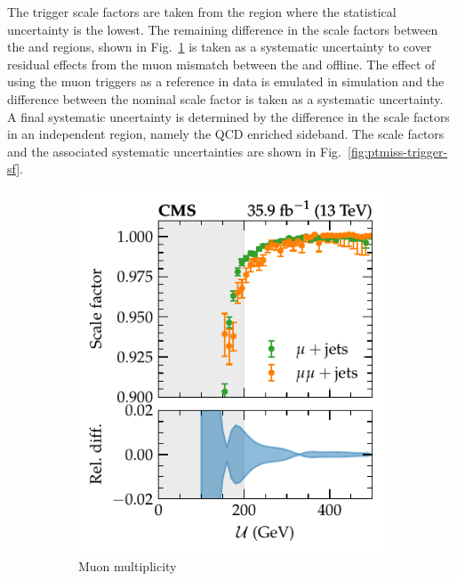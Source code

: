 The \ptmiss trigger scale factors are taken from the \muplusjets region where the statistical uncertainty is the lowest. The remaining difference in the scale factors between the \muplusjets and \dimuplusjets regions, shown in {Fig.~\ref{subfiga:ptmiss-trigger-sf}} is taken as a systematic uncertainty to cover residual effects from the muon mismatch between the \SWT and offline. The effect of using the muon triggers as a reference in data is emulated in simulation and the difference between the nominal scale factor is taken as a systematic uncertainty. A final systematic uncertainty is determined by the difference in the scale factors in an independent region, namely the \muplusjets QCD enriched sideband. The scale factors and the associated systematic uncertainties are shown in Fig.~\ref{fig:ptmiss-trigger-sf}.
%
\begin{figure}[htb]
    \centering
    \begin{subfigure}[b]{0.45\textwidth}
        \centering
        \includegraphics{chapters/041_corrections/images/efficiencies/triggers/met/met_trig_sf_muonsyst.pdf}
        \caption{Muon multiplicity}
        \label{subfiga:ptmiss-trigger-sf}
    \end{subfigure}
    \hfill
    \begin{subfigure}[b]{0.45\textwidth}
        \centering

\end{subfigure}
\end{figure}
